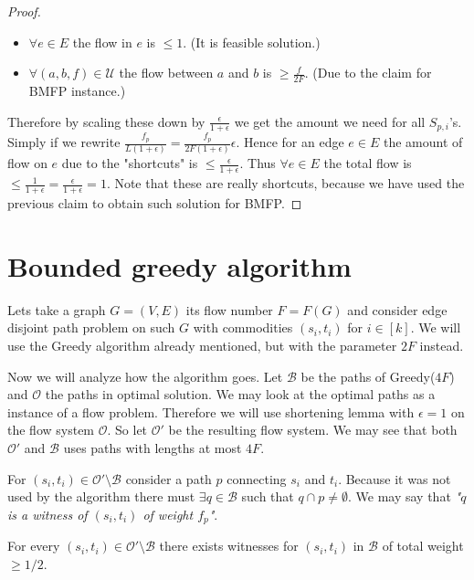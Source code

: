 \begin{proof}
	\begin{itemize}
		\item $\forall e \in E$ the flow in $e$ is $\leq 1$. (It is feasible solution.)
		\item $\forall (a, b, f) \in \mathcal{U}$ the flow between $a$ and $b$ is $\geq \frac{f}{2F}$. (Due to the claim for BMFP instance.)
	\end{itemize}
	
	Therefore by scaling these down by $\frac{\epsilon}{1 + \epsilon}$ we get the amount we need for all $S_{p,i}$'s. Simply if we rewrite $\frac{f_{p}}{L(1 + \epsilon)} = \frac{f_{p}}{2F(1 + \epsilon)}\epsilon$. Hence for an edge $e \in E$ the amount of flow on $e$ due to the "shortcuts" is $\leq \frac{\epsilon}{1+\epsilon}$. Thus $\forall e \in E$ the total flow is $\leq \frac{1}{1 + \epsilon} = \frac{\epsilon}{1+\epsilon} = 1$. Note that these are really shortcuts, because we have used the previous claim to obtain such solution for BMFP.
\end{proof}

\section{Bounded greedy algorithm}

Lets take a graph $G = (V,E)$ its flow number $F = F(G)$ and consider edge disjoint path problem on such $G$ with commodities $(s_{i}, t_{i})$ for $i \in [k]$. We will use the Greedy algorithm already mentioned, but with the parameter $2F$ instead.

Now we will analyze how the algorithm goes. Let $\mathcal{B}$ be the paths of Greedy($4F$) and $\mathcal{O}$ the paths in optimal solution. We may look at the optimal paths as a instance of a flow problem. Therefore we will use shortening lemma with $\epsilon = 1$ on the flow system $\mathcal{O}$. So let $\mathcal{O}'$ be the resulting flow system. We may see that both $\mathcal{O}'$ and $\mathcal{B}$ uses paths with lengths at most $4F$.

For $(s_{i}, t_{i}) \in \mathcal{O}' \setminus \mathcal{B}$ consider a path $p$ connecting $s_{i}$ and $t_{i}$. Because it was not used by the algorithm there must $\exists q \in \mathcal{B}$ such that $q \cap p \neq \emptyset$. We may say that \textit{"$q$ is a witness of $(s_{i},t_{i})$ of weight $f_{p}$"}.

\begin{observ}
	For every $(s_{i}, t_{i}) \in \mathcal{O}' \setminus \mathcal{B}$ there exists witnesses for $(s_{i}, t_{i})$ in $\mathcal{B}$ of total weight $\geq 1/2$.
\end{observ}

